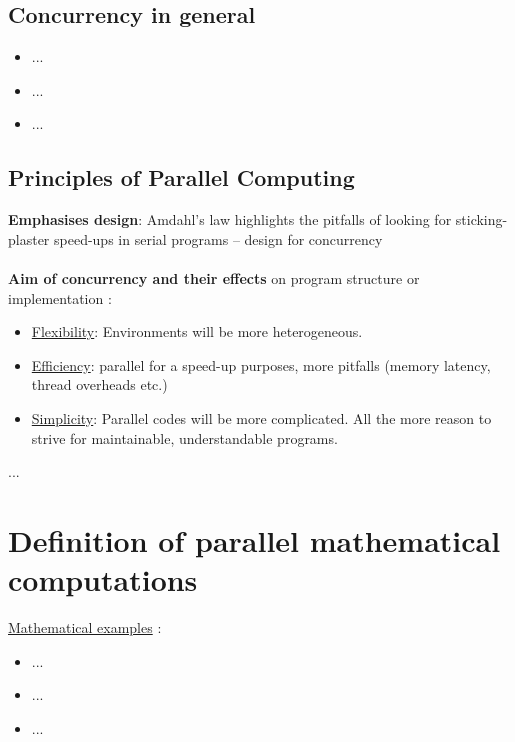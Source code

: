 \newpage

\subsection{Concurrency in general} \label{chap:concurrGeneral}

\begin{itemize}
	\item ...\parencite[see][p3]{internet1}
	\item ...\parencite[see][p3]{internet2}
	\item ...
\end{itemize}

\newpage

\subsection{Principles of Parallel Computing}\label{chap:parallelPrinciples}

\textbf{Emphasises design}:
Amdahl's law highlights the pitfalls of looking for
sticking-plaster speed-ups in serial programs –
design for concurrency \parencite[see][p4]{article6}
\\\\\textbf{Aim of concurrency and their effects} on program structure or implementation \parencite[see][p5]{article6}:
\begin{itemize}
  \item \underline{Flexibility}: Environments will be more heterogeneous.
  \item \underline{Efficiency}:	parallel for a speed-up purposes, more pitfalls (memory latency, thread overheads etc.)
  \item \underline{Simplicity}:	Parallel codes will be more complicated. All the more reason to strive for maintainable, understandable programs.\\
\end{itemize}
...\parencite[see][p11 ff.]{article6}

\newpage

\section{Definition of parallel mathematical computations}

\underline{Mathematical examples} \parencite{inbook1}:
\begin{itemize}
	\item ...\parencite[see][p8]{internet1}
	\item ...\parencite[see][p4]{internet2}
	\item ...\parencite[see][p398]{article7}
\end{itemize}

